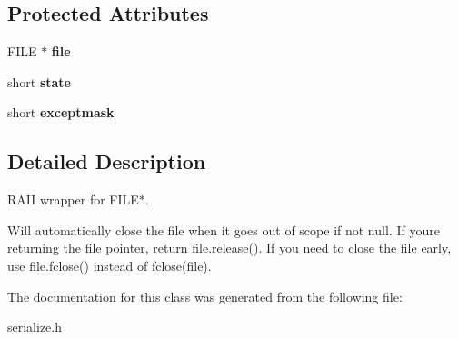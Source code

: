 \subsection*{Protected Attributes}
\begin{DoxyCompactItemize}
\item 
\mbox{\label{class_c_auto_file_a04ae666616ebc5d873c636fe6d2998ff}} 
F\+I\+LE $\ast$ {\bfseries file}
\item 
\mbox{\label{class_c_auto_file_aa345c8c05e4b305762c35fffd4fe2f26}} 
short {\bfseries state}
\item 
\mbox{\label{class_c_auto_file_a09729c28c239d6b157adee2c3853fa23}} 
short {\bfseries exceptmask}
\end{DoxyCompactItemize}


\subsection{Detailed Description}
R\+A\+II wrapper for F\+I\+L\+E$\ast$.

Will automatically close the file when it goes out of scope if not null. If you\textquotesingle{}re returning the file pointer, return file.\+release(). If you need to close the file early, use file.\+fclose() instead of fclose(file). 

The documentation for this class was generated from the following file\+:\begin{DoxyCompactItemize}
\item 
serialize.\+h\end{DoxyCompactItemize}
